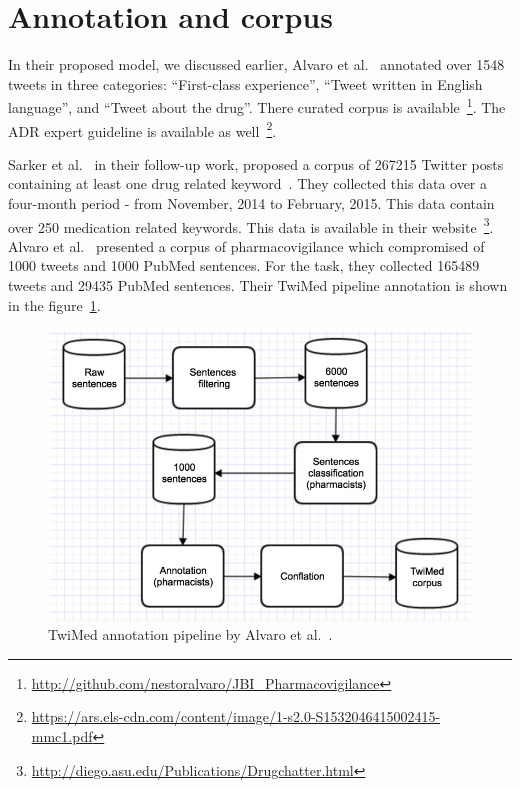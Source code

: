 \section{Annotation and corpus}

In their proposed model, we discussed earlier, Alvaro et al.~\cite{alvaro2015crowdsourcing} annotated over 1548 tweets in three categories: “First-class experience”, “Tweet written in English language”, and “Tweet about the drug”. There curated corpus is available~\footnote{\url{http://github.com/nestoralvaro/JBI_Pharmacovigilance}}. The ADR expert guideline is available as well~\footnote{\url{https://ars.els-cdn.com/content/image/1-s2.0-S1532046415002415-mmc1.pdf}}.

Sarker et al.~\cite{sarker2016social} in their follow-up work, proposed a corpus  of  267215  Twitter  posts  containing  at least one drug related keyword~\cite{sarker2017corpus}. They collected this data  over a four-month  period - from  November, 2014  to  February, 2015. This data contain over 250 medication related keywords. This data is available in their website~\footnote{\url{http://diego.asu.edu/Publications/Drugchatter.html}}. Alvaro et al.~\cite{alvaro2017twimed} presented a corpus of pharmacovigilance which compromised of 1000 tweets and 1000 PubMed sentences. For the task, they collected 165489 tweets and 29435 PubMed sentences. Their TwiMed pipeline annotation is shown in the figure~\ref{fig:architecture-twimed-alvaro}.

\begin{figure}[h]
	\centering
	\includegraphics[width=0.99\linewidth]{Figures/b.png}
	\caption{TwiMed annotation pipeline by Alvaro et al.~\cite{alvaro2017twimed}.}
	\label{fig:architecture-twimed-alvaro}
\end{figure}

